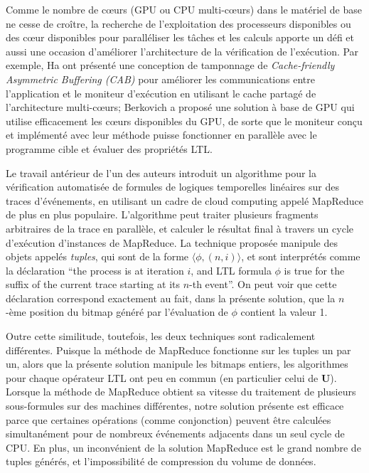 Comme le nombre de c\oe{}urs (GPU ou CPU multi-c\oe{}urs) dans le matériel de base ne cesse de croître, la recherche de l'exploitation des processeurs disponibles ou des c\oe{}ur disponibles pour paralléliser les tâches et les calculs apporte un défi et aussi une occasion d'améliorer l'architecture de la vérification de l'exécution. Par exemple, Ha \etal\@ \citep{ha2009concurrent} ont présenté une conception de tamponnage de \emph{Cache-friendly Asymmetric Buffering (CAB)} pour améliorer les communications entre l'application et le moniteur d'exécution en utilisant le cache partagé de l'architecture multi-c\oe{}urs; Berkovich \etal\@ \citep{DBLP:journals/fmsd/BerkovichBF15} a proposé une solution à base de GPU qui utilise efficacement les c\oe{}urs disponibles du GPU, de sorte que le moniteur conçu et implémenté avec leur méthode puisse fonctionner en parallèle avec le programme cible et évaluer des propriétés LTL.

Le travail antérieur de l'un des auteurs \citep{jocasa} introduit un algorithme pour la vérification automatisée de formules de logiques temporelles linéaires sur des traces d'événements, en utilisant un cadre de cloud computing appelé MapReduce de plus en plus populaire. L'algorithme peut traiter plusieurs fragments arbitraires de la trace en parallèle, et calculer le résultat final à travers un cycle d'exécution d'instances de MapReduce.
La technique proposée manipule des objets appelés \emph{tuples}, qui sont de la forme $\langle \phi, (n, i)\rangle$, et sont interprétés comme la déclaration ``the process is at iteration $i$, and LTL formula $\phi$ is true for the suffix of the current trace starting at its $n$-th event''. On peut voir que cette déclaration correspond exactement au fait, dans la présente solution, que la $n$-ème position du bitmap généré par l'évaluation de $\phi$ contient la valeur 1.

Outre cette similitude, toutefois, les deux techniques sont radicalement différentes. Puisque la méthode de MapReduce fonctionne sur les tuples un par un, alors que la présente solution manipule les bitmaps entiers, les algorithmes pour chaque opérateur LTL ont peu en commun (en particulier celui de \textbf{U}). Lorsque la méthode de MapReduce obtient sa vitesse du traitement de plusieurs sous-formules sur des machines différentes, notre solution présente est efficace parce que certaines opérations (comme conjonction) peuvent être calculées simultanément pour de nombreux événements adjacents dans un seul cycle de CPU. En plus, un inconvénient de la solution MapReduce est le grand nombre de tuples générés, et l'impossibilité de compression du volume de données.

